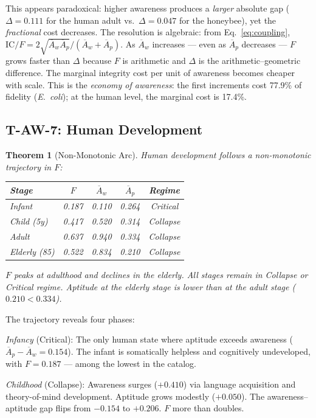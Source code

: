 \documentclass[
  aps,
  prd,
  twocolumn,
  superscriptaddress,
  nofootinbib,
  floatfix
]{revtex4-2}
\newtheorem{theorem}{Theorem}
\newcommand{\IC}{\mathrm{IC}}
\newcommand{\Aw}{\overline{A}_{\!w}}
\newcommand{\Ap}{\overline{A}_{\!p}}
\begin{document}
This appears paradoxical: higher awareness produces a
\emph{larger} absolute gap ($\Delta = 0.111$ for the human
adult vs.\ $\Delta = 0.047$ for the honeybee), yet the
\emph{fractional} cost decreases.  The resolution is
algebraic: from Eq.~\ref{eq:coupling},
$\IC/F = 2\sqrt{\Aw\Ap}/(\Aw + \Ap)$.
As $\Aw$ increases --- even as $\Ap$ decreases --- $F$
grows faster than $\Delta$ because $F$ is arithmetic and
$\Delta$ is the arithmetic--geometric difference.  The
marginal integrity cost per unit of awareness becomes
cheaper with scale.  This is the \emph{economy of awareness}:
the first increments cost 77.9\% of fidelity (\textit{E.~coli});
at the human level, the marginal cost is 17.4\%.

\subsection{T-AW-7: Human Development}

\begin{theorem}[Non-Monotonic Arc]\label{thm:TAW7}
Human development follows a non-monotonic trajectory in $F$:
\begin{center}
\begin{tabular}{lcccc}
\toprule
Stage & $F$ & $\Aw$ & $\Ap$ & Regime \\
\midrule
Infant     & 0.187 & 0.110 & 0.264 & Critical \\
Child (5y) & 0.417 & 0.520 & 0.314 & Collapse \\
Adult      & 0.637 & 0.940 & 0.334 & Collapse \\
Elderly (85) & 0.522 & 0.834 & 0.210 & Collapse \\
\bottomrule
\end{tabular}
\end{center}
$F$ peaks at adulthood and declines in the elderly.
All stages remain in Collapse or Critical regime.
Aptitude at the elderly stage is lower than at
the adult stage ($0.210 < 0.334$).
\end{theorem}

The trajectory reveals four phases:

\emph{Infancy} (Critical): The only human state where aptitude
exceeds awareness ($\Ap - \Aw = 0.154$).  The infant is
somatically helpless and cognitively undeveloped, with
$F = 0.187$ --- among the lowest in the catalog.

\emph{Childhood} (Collapse): Awareness surges ($+0.410$) via
language acquisition and theory-of-mind development.  Aptitude
grows modestly ($+0.050$).  The awareness--aptitude gap flips
from $-0.154$ to $+0.206$.  $F$ more than doubles.
\end{document}
